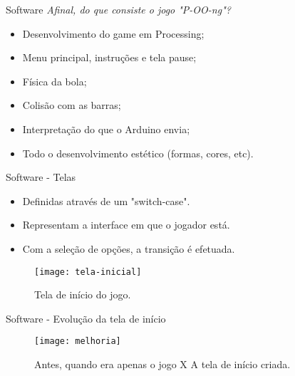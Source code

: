 \begin{frame}[c]{Software}
	\emph {Afinal, do que consiste o jogo "P-OO-ng"?}
	\vspace{0.2cm}

\begin{itemize}
	\item Desenvolvimento do game em Processing;
	\item Menu principal, instruções e tela pause;
	\item Física da bola;
	\item Colisão com as barras;
	\item Interpretação do que o Arduino envia;
	\item Todo o desenvolvimento estético (formas, cores, etc).
\end{itemize}
    
 \end{frame}
\begin{frame}[c]{Software - Telas}
\begin{itemize}
	\item Definidas através de um "switch-case".
	\item Representam a interface em que o jogador está.
	\item Com a seleção de opções, a transição é efetuada.
\end{itemize}
  
\begin{figure}
	\centering
    	\texttt{[image: tela-inicial]}
    	\caption{Tela de início do jogo.}
\end{figure}

\end{frame}
\begin{frame}[c]{Software - Evolução da tela de início}
    
  \begin{figure}
	\centering
    	\texttt{[image: melhoria]}
    	\caption{Antes, quando era apenas o jogo X A tela de início criada.}
\end{figure}


\end{frame}
